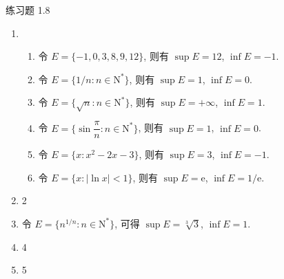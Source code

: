 



% 


\begin{center}
    {\heiti 练习题 1.8}
\end{center}

\begin{enumerate}
    \item 
        \begin{enumerate}[(1)]
            \item 令 $E = \{-1, 0, 3, 8, 9, 12\}$, 则有 $\sup E = 12$, $\inf E = -1$.
            \item 令 $E = \{1/n: n \in \mathrm{N}^*\}$, 则有 $\sup E = 1$, $\inf E = 0$.
            \item 令 $E = \{\sqrt{n}: n \in \mathrm{N}^*\}$, 则有 $\sup E = +\infty$, $\inf E = 1$.
            \item 令 $E = \{\sin\dfrac{\pi}{n}: n \in \mathrm{N}^*\}$, 则有 $\sup E = 1$, $\inf E = 0$.
            \item 令 $E = \{x: x^2 - 2x - 3\}$, 则有 $\sup E = 3$, $\inf E = -1$.
            \item 令 $E = \{x: |\ln x| < 1\}$, 则有 $\sup E = \mathrm{e}$, $\inf E = 1/\mathrm{e}$.
        \end{enumerate}
    \item 2
    \item 令 $E = \{ n^{1/n}: n\in\mathrm{N}^* \}$, 可得 $\sup E = \sqrt[3]{3}$, $\inf E = 1$.
    \item 4
    \item 5
\end{enumerate}
% 
